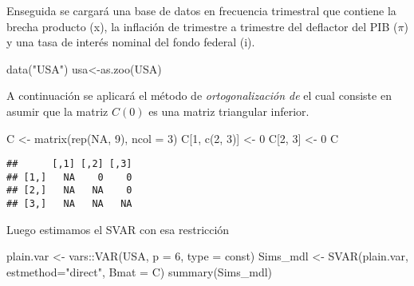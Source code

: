 \documentclass[
]{book}
\newenvironment{Shaded}{\begin{snugshade}}{\end{snugshade}}
\newcommand{\AttributeTok}[1]{\textcolor[rgb]{0.77,0.63,0.00}{#1}}
\newcommand{\ConstantTok}[1]{\textcolor[rgb]{0.00,0.00,0.00}{#1}}
\newcommand{\DecValTok}[1]{\textcolor[rgb]{0.00,0.00,0.81}{#1}}
\newcommand{\FunctionTok}[1]{\textcolor[rgb]{0.00,0.00,0.00}{#1}}
\newcommand{\NormalTok}[1]{#1}
\newcommand{\OtherTok}[1]{\textcolor[rgb]{0.56,0.35,0.01}{#1}}
\newcommand{\SpecialCharTok}[1]{\textcolor[rgb]{0.00,0.00,0.00}{#1}}
\newcommand{\StringTok}[1]{\textcolor[rgb]{0.31,0.60,0.02}{#1}}
\begin{document}
Enseguida se cargará una base de datos en frecuencia trimestral que contiene la brecha producto (x), la inflación de trimestre a trimestre del deflactor del PIB (\(\pi\)) y una tasa de interés nominal del fondo federal (i).

\begin{Shaded}
\begin{Highlighting}[]
\FunctionTok{data}\NormalTok{(}\StringTok{"USA"}\NormalTok{)}
\NormalTok{usa}\OtherTok{\textless{}{-}}\FunctionTok{as.zoo}\NormalTok{(USA)}
\end{Highlighting}
\end{Shaded}

A continuación se aplicará el método de \emph{ortogonalización de} \citet{Sims80} el cual consiste en asumir que la matriz \(C(0)\) es una matriz triangular inferior.

\begin{Shaded}
\begin{Highlighting}[]
\NormalTok{C }\OtherTok{\textless{}{-}} \FunctionTok{matrix}\NormalTok{(}\FunctionTok{rep}\NormalTok{(}\ConstantTok{NA}\NormalTok{, }\DecValTok{9}\NormalTok{), }\AttributeTok{ncol =} \DecValTok{3}\NormalTok{)}
\NormalTok{C[}\DecValTok{1}\NormalTok{, }\FunctionTok{c}\NormalTok{(}\DecValTok{2}\NormalTok{, }\DecValTok{3}\NormalTok{)] }\OtherTok{\textless{}{-}} \DecValTok{0}
\NormalTok{C[}\DecValTok{2}\NormalTok{, }\DecValTok{3}\NormalTok{] }\OtherTok{\textless{}{-}} \DecValTok{0}
\NormalTok{C}
\end{Highlighting}
\end{Shaded}

\begin{verbatim}
##      [,1] [,2] [,3]
## [1,]   NA    0    0
## [2,]   NA   NA    0
## [3,]   NA   NA   NA
\end{verbatim}

Luego estimamos el SVAR con esa restricción

\begin{Shaded}
\begin{Highlighting}[]
\NormalTok{plain.var }\OtherTok{\textless{}{-}}\NormalTok{ vars}\SpecialCharTok{::}\FunctionTok{VAR}\NormalTok{(USA, }\AttributeTok{p =} \DecValTok{6}\NormalTok{, }\AttributeTok{type =} \StringTok{\textquotesingle{}const\textquotesingle{}}\NormalTok{)}
\NormalTok{Sims\_mdl  }\OtherTok{\textless{}{-}} \FunctionTok{SVAR}\NormalTok{(plain.var, }\AttributeTok{estmethod=}\StringTok{"direct"}\NormalTok{, }\AttributeTok{Bmat =}\NormalTok{ C)}
\FunctionTok{summary}\NormalTok{(Sims\_mdl)}
\end{Highlighting}
\end{Shaded}
\end{document}
